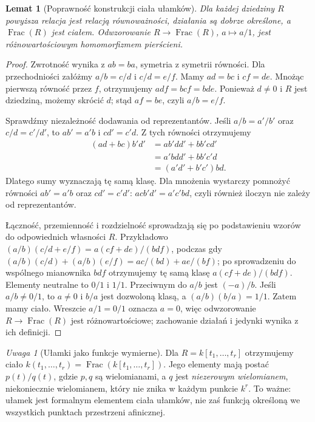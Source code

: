 \documentclass[11pt,a4paper,openany]{report}
\numberwithin{equation}{section}
\theoremstyle{plain}
\newtheorem{lemat}[twierdzenie]{Lemat}
\theoremstyle{definition}
\theoremstyle{remark}
\newtheorem{uwaga}[twierdzenie]{Uwaga}
\newcommand{\Frac}{\operatorname{Frac}}
\begin{document}
\begin{lemat}[Poprawność konstrukcji ciała ułamków]
\label{lem:frac-construction}
Dla każdej dziedziny $R$ powyższa relacja jest relacją
równoważności, działania są dobrze określone, a $\Frac(R)$
jest ciałem. Odwzorowanie $R\to\Frac(R)$,
$a\mapsto a/1$, jest różnowartościowym homomorfizmem pierścieni.
\end{lemat}
\begin{proof}
Zwrotność wynika z $ab=ba$, symetria z symetrii równości.
Dla przechodniości załóżmy $a/b=c/d$ i $c/d=e/f$.
Mamy $ad=bc$ i $cf=de$. Mnożąc pierwszą równość przez
$f$, otrzymujemy $adf=bcf=bde$. Ponieważ $d\ne0$
i $R$ jest dziedziną, możemy skrócić $d$; stąd $af=be$,
czyli $a/b=e/f$.

Sprawdźmy niezależność dodawania od reprezentantów.
Jeśli $a/b=a'/b'$ oraz $c/d=c'/d'$, to
$ab'=a'b$ i $cd'=c'd$. Z tych równości otrzymujemy
\begin{align*}
(ad+bc)b'd'
 &=ab'dd'+bb'cd'\\
 &=a'bdd'+bb'c'd\\
 &=(a'd'+b'c')bd.
\end{align*}
Dlatego sumy wyznaczają tę samą klasę. Dla mnożenia
wystarczy pomnożyć równości $ab'=a'b$ oraz $cd'=c'd'$:
$acb'd'=a'c'bd$, czyli również iloczyn nie zależy od
reprezentantów.

Łączność, przemienność i rozdzielność sprowadzają się
po podstawieniu wzorów do odpowiednich własności $R$.
Przykładowo $(a/b)(c/d+e/f)=a(cf+de)/(bdf)$,
podczas gdy $(a/b)(c/d)+(a/b)(e/f)=ac/(bd)+ae/(bf)$;
po sprowadzeniu do wspólnego mianownika $bdf$ otrzymujemy
tę samą klasę $a(cf+de)/(bdf)$.
Elementy neutralne to $0/1$ i $1/1$.
Przeciwnym do $a/b$ jest $(-a)/b$.
Jeśli $a/b\ne0/1$, to $a\ne0$ i $b/a$ jest dozwoloną klasą,
a $(a/b)(b/a)=1/1$. Zatem mamy ciało.
Wreszcie $a/1=0/1$ oznacza $a=0$, więc odwzorowanie
$R\to\Frac(R)$ jest różnowartościowe; zachowanie działań
i jedynki wynika z ich definicji.
\end{proof}

\begin{uwaga}[Ułamki jako funkcje wymierne]
Dla $R=k[t_1,\dots,t_r]$ otrzymujemy ciało
$k(t_1,\dots,t_r)=\Frac(k[t_1,\dots,t_r])$.
Jego elementy mają postać $p(t)/q(t)$, gdzie $p,q$ są
wielomianami, a $q$ jest \emph{niezerowym wielomianem},
niekoniecznie wielomianem, który nie znika w każdym punkcie $k^r$.
To ważne: ułamek jest formalnym elementem ciała ułamków,
nie zaś funkcją określoną we wszystkich punktach przestrzeni afinicznej.
\end{uwaga}
\end{document}
